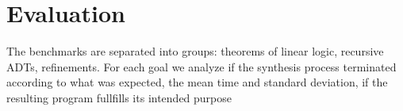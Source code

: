 \documentclass{llncs}
\newcommand{\lolli}{\multimap}
\newcommand{\tensor}{\otimes}
\newcommand{\bang}{{!}}
\newcommand{\mypara}[1]{\paragraph{\textbf{#1}.}}
\begin{document}







\section{Evaluation}\label{sec:evaluation}

The benchmarks are separated into groups: theorems of linear logic, recursive
ADTs, refinements. For each goal we analyze if the synthesis process terminated
according to what was expected, the mean time and standard deviation, if the
resulting program fullfills its intended purpose

\end{document}
